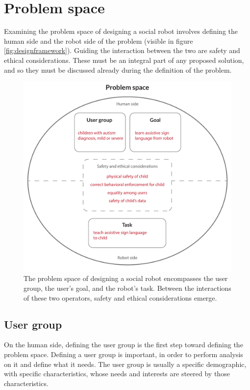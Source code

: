  
\section{Problem space}

Examining the problem space of designing a social robot involves defining the human side and the robot side of the problem (visible in figure \ref{fig:designframework}). Guiding the interaction between the two are safety and ethical considerations. These must be an integral part of any proposed solution, and so they must be discussed already during the definition of the problem.

\begin{figure}
\centering
  \includegraphics[scale=0.65]{images/problem_v1.pdf}
  \caption{The problem space of designing a social robot encompasses the user group, the user's goal, and the robot's task. Between the interactions of these two operators, safety and ethical considerations emerge.}
  \label{fig:problem}
\end{figure}




\subsection{User group}

On the human side, defining the user group is the first step toward defining the problem space. Defining a user group is important, in order to perform analysis on it and define what it needs. The user group is usually a specific demographic, with specific characteristics, whose needs and interests are steered by those characteristics. 

